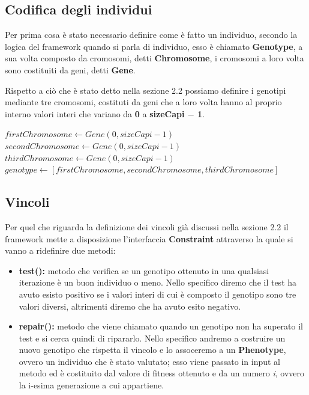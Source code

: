 \documentclass[a4paper, 11pt, oneside]{report}
\begin{document}
                \subsection{Codifica degli individui}
                \par \noindent Per prima cosa è stato necessario definire come è fatto un individuo, secondo la logica
                del framework quando si parla di individuo, esso è chiamato \textbf{Genotype}, a sua volta composto
                da cromosomi, detti \textbf{Chromosome}, i cromosomi a loro volta sono costituiti da geni, detti
                \textbf{Gene}.
                \medskip
                \par \noindent Rispetto a ciò che è stato detto nella sezione 2.2 possiamo definire
                i genotipi mediante tre cromosomi, costituti da geni che a loro volta hanno al proprio interno valori
                interi che variano da \textbf{0} a \textbf{sizeCapi $-$ 1}.
                \medskip
                \begin{algorithmic}[1]
                    \State $firstChromosome \gets Gene(0,sizeCapi-1)$
                    \State $secondChromosome \gets Gene(0,sizeCapi-1)$
                    \State $thirdChromosome \gets Gene(0,sizeCapi-1)$
                    \State $genotype \gets [firstChromosome, secondChromosome, thirdChromosome]$
                \end{algorithmic}

                \subsection{Vincoli}
                \par \noindent Per quel che riguarda la definizione dei vincoli già discussi nella sezione 2.2
                il framework mette a disposizione l'interfaccia \textbf{Constraint} attraverso la quale si vanno a ridefinire
                due metodi:
                \begin{itemize}
                    \item \textbf{test():} metodo che verifica se un genotipo ottenuto in una qualsiasi iterazione è un
                    buon individuo o meno.
                    Nello specifico diremo che il test ha avuto esisto positivo se i valori interi di cui è composto il
                    genotipo sono tre valori diversi, altrimenti diremo che ha avuto esito negativo.
                    \item \textbf{repair():} metodo che viene chiamato quando un genotipo non ha superato il test e si
                    cerca quindi di ripararlo.
                    Nello specifico andremo a costruire un nuovo genotipo che rispetta il vincolo e lo assoceremo a un
                    \textbf{Phenotype}, ovvero un individuo che è stato valutato; esso viene passato in input al metodo
                    ed è costituito dal valore di fitness ottenuto e da un numero \emph{i}, ovvero la i-esima generazione
                    a cui appartiene.
                \end{itemize}
\end{document}
